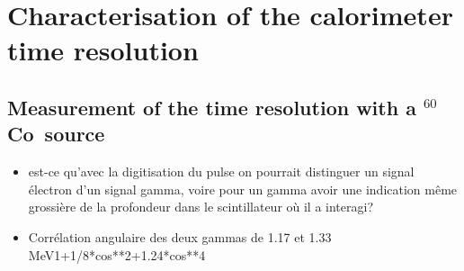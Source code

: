\documentclass[a4paper,12pt, twoside]{memoir}   	%
\newcommand{\Co}{$^{60}$Co}
\begin{document}
\chapter{Characterisation of the calorimeter time resolution}
\section{Measurement of the time resolution with a \Co\ source}
\begin{itemize}
\item est-ce qu'avec la digitisation du pulse on pourrait distinguer un signal électron d'un signal gamma, voire pour un gamma avoir une indication même grossière de la profondeur dans le scintillateur où il a interagi?
\item Corrélation angulaire des deux gammas de 1.17 et 1.33 MeV1+1/8*cos**2+1.24*cos**4
\end{itemize}
\end{document}
